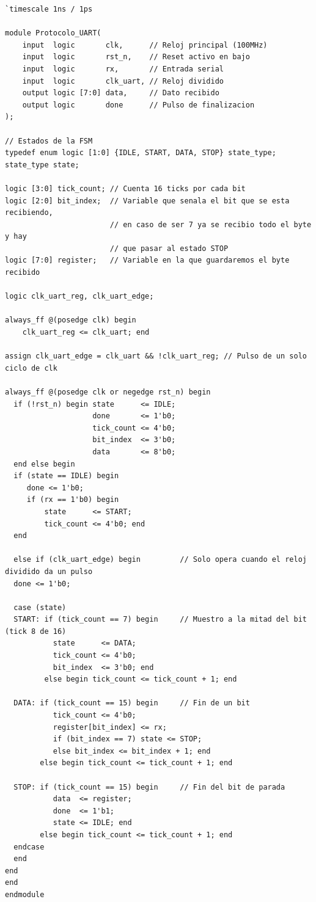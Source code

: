 \documentclass[letterpaper, 12pt]{article}
\begin{document}
\begin{lstlisting}
`timescale 1ns / 1ps

module Protocolo_UART(
    input  logic       clk,      // Reloj principal (100MHz)
    input  logic       rst_n,    // Reset activo en bajo
    input  logic       rx,       // Entrada serial
    input  logic       clk_uart, // Reloj dividido
    output logic [7:0] data,     // Dato recibido
    output logic       done      // Pulso de finalizacion
);

// Estados de la FSM
typedef enum logic [1:0] {IDLE, START, DATA, STOP} state_type;
state_type state;

logic [3:0] tick_count; // Cuenta 16 ticks por cada bit
logic [2:0] bit_index;  // Variable que senala el bit que se esta recibiendo, 
                        // en caso de ser 7 ya se recibio todo el byte y hay 
                        // que pasar al estado STOP
logic [7:0] register;   // Variable en la que guardaremos el byte recibido

logic clk_uart_reg, clk_uart_edge;

always_ff @(posedge clk) begin
    clk_uart_reg <= clk_uart; end

assign clk_uart_edge = clk_uart && !clk_uart_reg; // Pulso de un solo ciclo de clk

always_ff @(posedge clk or negedge rst_n) begin
  if (!rst_n) begin state      <= IDLE;
                    done       <= 1'b0;
                    tick_count <= 4'b0;
                    bit_index  <= 3'b0;
                    data       <= 8'b0;
  end else begin
  if (state == IDLE) begin
     done <= 1'b0;
     if (rx == 1'b0) begin
         state      <= START;
         tick_count <= 4'b0; end
  end
                                    
  else if (clk_uart_edge) begin         // Solo opera cuando el reloj dividido da un pulso
  done <= 1'b0;
  
  case (state)
  START: if (tick_count == 7) begin     // Muestro a la mitad del bit (tick 8 de 16)
           state      <= DATA;
           tick_count <= 4'b0;
           bit_index  <= 3'b0; end
         else begin tick_count <= tick_count + 1; end
         
  DATA: if (tick_count == 15) begin     // Fin de un bit
           tick_count <= 4'b0;
           register[bit_index] <= rx;
           if (bit_index == 7) state <= STOP;
           else bit_index <= bit_index + 1; end
        else begin tick_count <= tick_count + 1; end

  STOP: if (tick_count == 15) begin     // Fin del bit de parada
           data  <= register;
           done  <= 1'b1;
           state <= IDLE; end
        else begin tick_count <= tick_count + 1; end  
  endcase
  end
end
end
endmodule
\end{lstlisting}
\end{document}
